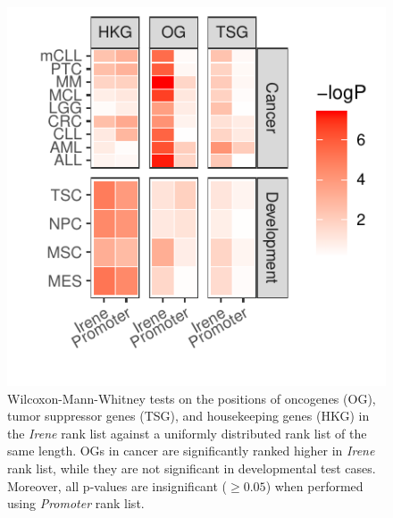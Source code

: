 \documentclass[a4paper,12pt]{article}
\begin{document}
\begin{figure}[!htb]
\centering
\includegraphics{figs/oncoRank.pdf}
\caption{ Wilcoxon-Mann-Whitney tests on the positions of oncogenes (OG), tumor suppressor genes (TSG), and housekeeping genes (HKG) in the {\em Irene} rank list against a uniformly distributed rank list of the same length. OGs in cancer are significantly ranked higher in {\em Irene} rank list, while they are not significant in developmental test cases. Moreover, all p-values are insignificant ($\geq 0.05$) when performed using {\em Promoter} rank list. }
\label{fig:og}
\end{figure}
\end{document}
